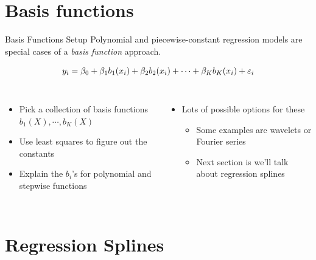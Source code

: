\documentclass[aspectratio=169,usenames,dvipsnames]{beamer}
\newcommand{\InstructorList}[1]{
\begin{itemize}
	\color{orange}
	#1
\end{itemize}
}
\begin{document}
\section{Basis functions}


\begin{frame}[t]{Basis Functions Setup}
Polynomial and piecewise-constant regression models are special cases of a \textit{basis function} approach.

\begin{equation*}
	y_i = \beta_0 + \beta_1b_1(x_i) + \beta_2 b_2(x_i) + \cdots + \beta_K b_K(x_i) + \varepsilon_i
\end{equation*}

\begin{columns}
\centering
\InstructorList{
  \item Pick a collection of basis functions $b_1(X),\cdots,b_K(X)$
	\item Use least squares to figure out the constants
	\item Explain the $b_i$'s for polynomial and stepwise functions

}

\centering

\InstructorList{
	\item Lots of possible options for these
	\InstructorList{
	  \item Some examples are wavelets or Fourier series
		\item Next section is we'll talk about regression splines
	}
}


\end{columns}

\end{frame}


\section{Regression Splines}
\end{document}
